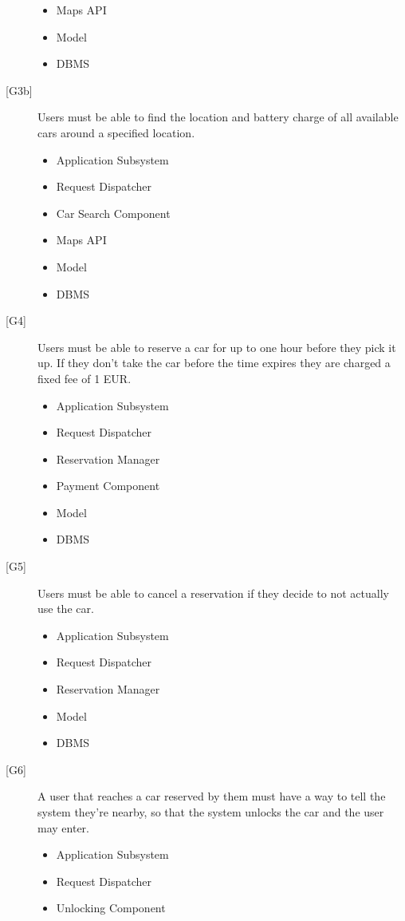 \documentclass[english]{article}
\begin{document}
\begin{description}
\begin{itemize}
		\item{Maps API}
		\item{Model}
		\item{DBMS}
	\end{itemize}
	\item[{[G3b]}]{Users must be able to find the location and battery charge of all available cars around a specified location.}
	\begin{itemize}
		\item{Application Subsystem}
		\item{Request Dispatcher}
		\item{Car Search Component}
		\item{Maps API}
		\item{Model}
		\item{DBMS}
	\end{itemize}
	\item[{[G4]}]{Users must be able to reserve a car for up to one hour before they pick it up. If they don't take the car before the time expires they are charged a fixed fee of 1 EUR.}
	\begin{itemize}
		\item{Application Subsystem}
		\item{Request Dispatcher}
		\item{Reservation Manager}
		\item{Payment Component}
		\item{Model}
		\item{DBMS}
	\end{itemize}
	\item[{[G5]}]{Users must be able to cancel a reservation if they decide to not actually use the car.}
	\begin{itemize}
		\item{Application Subsystem}
		\item{Request Dispatcher}
		\item{Reservation Manager}
		\item{Model}
		\item{DBMS}
	\end{itemize}
	\item[{[G6]}]{A user that reaches a car reserved by them must have a way to tell the system they’re nearby, so that the system unlocks the car and the user may enter.}
	\begin{itemize}
		\item{Application Subsystem}
		\item{Request Dispatcher}
		\item{Unlocking Component}

\end{itemize}
\end{description}
\end{document}

